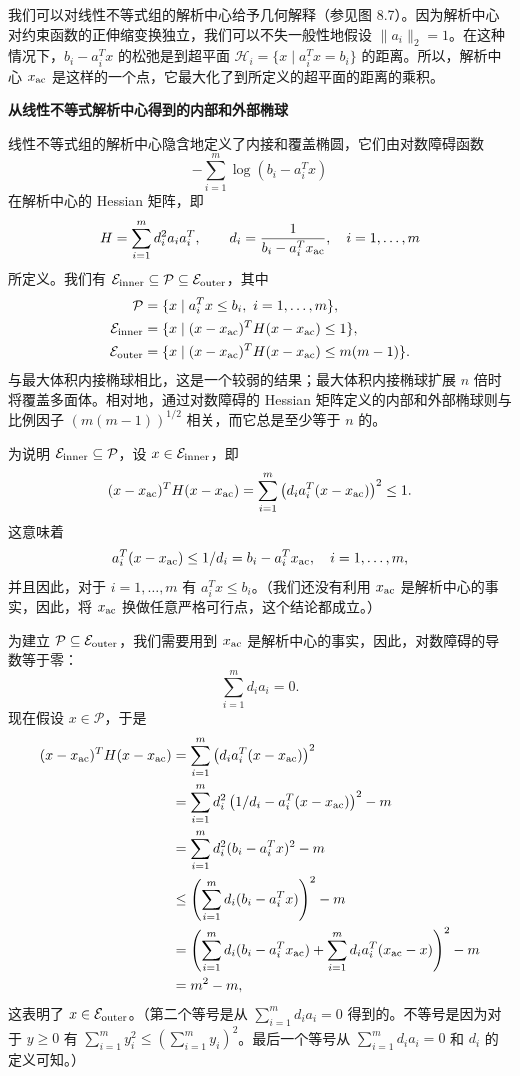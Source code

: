\documentclass[UTF8,12pt,a4paper,fontset=fandol]{ctexart}
\begin{document}
我们可以对线性不等式组的解析中心给予几何解释（参见图 8.7）。因为解析中心对约束函数的正伸缩变换独立，我们可以不失一般性地假设 $\|a_i\|_2=1$。在这种情况下，$b_i-a_i^Tx$ 的松弛是到超平面 $\mathcal{H}_i=\{x\mid a_i^Tx=b_i\}$ 的距离。所以，解析中心 $x_{\rm ac}$ 是这样的一个点，它最大化了到所定义的超平面的距离的乘积。

\noindent\textbf{从线性不等式解析中心得到的内部和外部椭球}

线性不等式组的解析中心隐含地定义了内接和覆盖椭圆，它们由对数障碍函数
\[
-\sum_{i=1}^m \log(b_i-a_i^Tx)
\]
在解析中心的 Hessian 矩阵，即
\[
H=\sum_{i=1}^m d_i^2 a_i a_i^T,\qquad d_i=\frac{1}{b_i-a_i^Tx_{\rm ac}},\quad i=1,\ldots,m
\]
所定义。我们有 $\mathcal{E}_{\rm inner}\subseteq\mathcal{P}\subseteq\mathcal{E}_{\rm outer}$，其中
\[
\begin{split}
\mathcal{P}&=\{x\mid a_i^Tx\leq b_i,\ i=1,\ldots,m\},\\
\mathcal{E}_{\rm inner}&=\{x\mid (x-x_{\rm ac})^TH(x-x_{\rm ac})\leq 1\},\\
\mathcal{E}_{\rm outer}&=\{x\mid (x-x_{\rm ac})^TH(x-x_{\rm ac})\leq m(m-1)\}.
\end{split}
\]
与最大体积内接椭球相比，这是一个较弱的结果；最大体积内接椭球扩展 $n$ 倍时将覆盖多面体。相对地，通过对数障碍的 Hessian 矩阵定义的内部和外部椭球则与比例因子 $(m(m-1))^{1/2}$ 相关，而它总是至少等于 $n$ 的。

为说明 $\mathcal{E}_{\rm inner}\subseteq\mathcal{P}$，设 $x\in\mathcal{E}_{\rm inner}$，即
\[
(x-x_{\rm ac})^TH(x-x_{\rm ac})
=\sum_{i=1}^m\left(d_ia_i^T(x-x_{\rm ac})\right)^2\leq 1.
\]
这意味着
\[
a_i^T(x-x_{\rm ac})\leq 1/d_i=b_i-a_i^Tx_{\rm ac},\quad i=1,\ldots,m,
\]
并且因此，对于 $i=1,\ldots,m$ 有 $a_i^Tx\leq b_i$。（我们还没有利用 $x_{\rm ac}$ 是解析中心的事实，因此，将 $x_{\rm ac}$ 换做任意严格可行点，这个结论都成立。）

为建立 $\mathcal{P}\subseteq\mathcal{E}_{\rm outer}$，我们需要用到 $x_{\rm ac}$ 是解析中心的事实，因此，对数障碍的导数等于零：
\[
\sum_{i=1}^m d_i a_i=0.
\]
现在假设 $x\in\mathcal{P}$，于是
\[
\begin{split}
(x-x_{\rm ac})^TH(x-x_{\rm ac})
&=\sum_{i=1}^m\left(d_i a_i^T(x-x_{\rm ac})\right)^2\\
&=\sum_{i=1}^m d_i^2\left(1/d_i-a_i^T(x-x_{\rm ac})\right)^2-m\\
&=\sum_{i=1}^m d_i^2(b_i-a_i^Tx)^2-m\\
&\leq \left(\sum_{i=1}^m d_i(b_i-a_i^Tx)\right)^2-m\\
&=\left(\sum_{i=1}^m d_i(b_i-a_i^Tx_{\rm ac})+\sum_{i=1}^m d_i a_i^T(x_{\rm ac}-x)\right)^2-m\\
&=m^2-m,
\end{split}
\]
这表明了 $x\in\mathcal{E}_{\rm outer}$。（第二个等号是从 $\sum_{i=1}^m d_i a_i=0$ 得到的。不等号是因为对于 $y\geq 0$ 有 $\sum_{i=1}^m y_i^2\leq (\sum_{i=1}^m y_i)^2$。最后一个等号从 $\sum_{i=1}^m d_i a_i=0$ 和 $d_i$ 的定义可知。）
\end{document}
